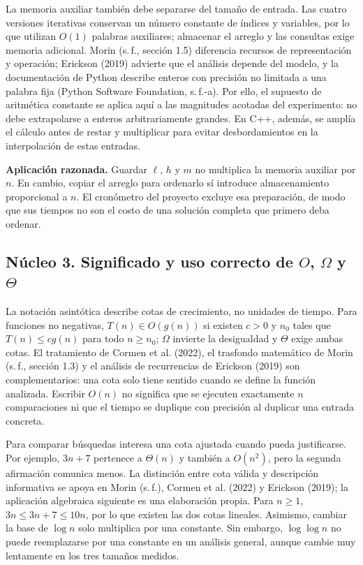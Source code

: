 La memoria auxiliar también debe separarse del tamaño de entrada. Las cuatro versiones iterativas conservan un número constante de índices y variables, por lo que utilizan $O(1)$ palabras auxiliares; almacenar el arreglo y las consultas exige memoria adicional. Morin (s.\,f., sección 1.5) diferencia recursos de representación y operación; Erickson (2019) advierte que el análisis depende del modelo, y la documentación de Python describe enteros con precisión no limitada a una palabra fija (Python Software Foundation, s.\,f.-a). Por ello, el supuesto de aritmética constante se aplica aquí a las magnitudes acotadas del experimento: no debe extrapolarse a enteros arbitrariamente grandes. En C++, además, se amplía el cálculo antes de restar y multiplicar para evitar desbordamientos en la interpolación de estas entradas.

\textbf{Aplicación razonada.} Guardar $\ell$, $h$ y $m$ no multiplica la memoria auxiliar por $n$. En cambio, copiar el arreglo para ordenarlo sí introduce almacenamiento proporcional a $n$. El cronómetro del proyecto excluye esa preparación, de modo que sus tiempos no son el costo de una solución completa que primero deba ordenar.

\subsection{Núcleo 3. Significado y uso correcto de \texorpdfstring{$O$, $\Omega$ y $\Theta$}{O, Omega y Theta}}
La notación asintótica describe cotas de crecimiento, no unidades de tiempo. Para funciones no negativas, $T(n)\in O(g(n))$ si existen $c>0$ y $n_0$ tales que $T(n)\leq c g(n)$ para todo $n\geq n_0$; $\Omega$ invierte la desigualdad y $\Theta$ exige ambas cotas. El tratamiento de Cormen et al. (2022), el trasfondo matemático de Morin (s.\,f., sección 1.3) y el análisis de recurrencias de Erickson (2019) son complementarios: una cota solo tiene sentido cuando se define la función analizada. Escribir $O(n)$ no significa que se ejecuten exactamente $n$ comparaciones ni que el tiempo se duplique con precisión al duplicar una entrada concreta.

Para comparar búsquedas interesa una cota ajustada cuando pueda justificarse. Por ejemplo, $3n+7$ pertenece a $\Theta(n)$ y también a $O(n^2)$, pero la segunda afirmación comunica menos. La distinción entre cota válida y descripción informativa se apoya en Morin (s.\,f.), Cormen et al. (2022) y Erickson (2019); la aplicación algebraica siguiente es una elaboración propia. Para $n\geq1$, $3n\leq3n+7\leq10n$, por lo que existen las dos cotas lineales. Asimismo, cambiar la base de $\log n$ solo multiplica por una constante. Sin embargo, $\log\log n$ no puede reemplazarse por una constante en un análisis general, aunque cambie muy lentamente en los tres tamaños medidos.

